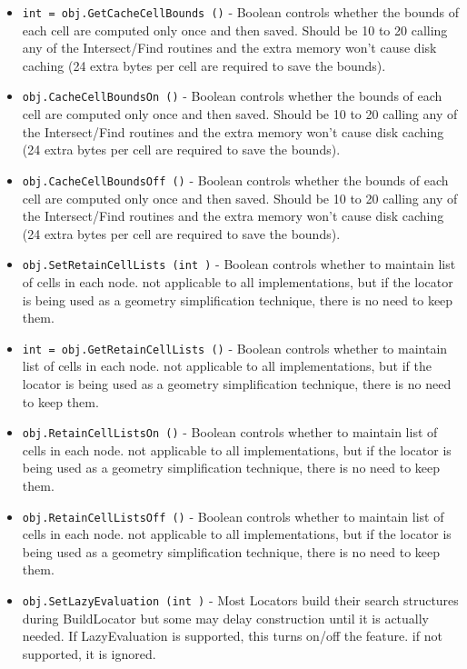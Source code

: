 \begin{itemize}
\item  \verb|int = obj.GetCacheCellBounds ()| -  Boolean controls whether the bounds of each cell are computed only
 once and then saved.  Should be 10 to 20%
 calling any of the Intersect/Find routines and the extra memory
 won't cause disk caching (24 extra bytes per cell are required to
 save the bounds).

\item  \verb|obj.CacheCellBoundsOn ()| -  Boolean controls whether the bounds of each cell are computed only
 once and then saved.  Should be 10 to 20%
 calling any of the Intersect/Find routines and the extra memory
 won't cause disk caching (24 extra bytes per cell are required to
 save the bounds).

\item  \verb|obj.CacheCellBoundsOff ()| -  Boolean controls whether the bounds of each cell are computed only
 once and then saved.  Should be 10 to 20%
 calling any of the Intersect/Find routines and the extra memory
 won't cause disk caching (24 extra bytes per cell are required to
 save the bounds).

\item  \verb|obj.SetRetainCellLists (int )| -  Boolean controls whether to maintain list of cells in each node.
 not applicable to all implementations, but if the locator is being used
 as a geometry simplification technique, there is no need to keep them.

\item  \verb|int = obj.GetRetainCellLists ()| -  Boolean controls whether to maintain list of cells in each node.
 not applicable to all implementations, but if the locator is being used
 as a geometry simplification technique, there is no need to keep them.

\item  \verb|obj.RetainCellListsOn ()| -  Boolean controls whether to maintain list of cells in each node.
 not applicable to all implementations, but if the locator is being used
 as a geometry simplification technique, there is no need to keep them.

\item  \verb|obj.RetainCellListsOff ()| -  Boolean controls whether to maintain list of cells in each node.
 not applicable to all implementations, but if the locator is being used
 as a geometry simplification technique, there is no need to keep them.

\item  \verb|obj.SetLazyEvaluation (int )| -  Most Locators build their search structures during BuildLocator
 but some may delay construction until it is actually needed.
 If LazyEvaluation is supported, this turns on/off the feature.
 if not supported, it is ignored.


\end{itemize}
